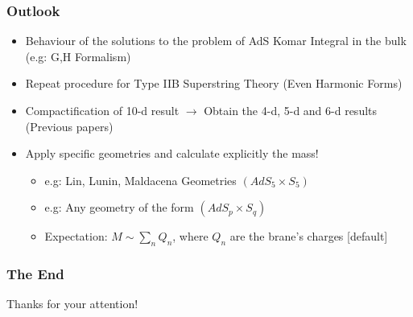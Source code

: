 \documentclass[t]{beamer}
\begin{document}

\begin{frame}
\frametitle{Outlook}

\begin{itemize}
\setlength{\parskip}{10pt}

\item<1->  Behaviour of the solutions to the problem of AdS Komar Integral in the bulk (e.g: G,H Formalism)

\item<2->  Repeat procedure for Type IIB Superstring Theory (Even Harmonic Forms)

\item<3->  Compactification of 10-d result $\rightarrow$ Obtain the 4-d, 5-d and 6-d results (Previous papers)

\item<4-> Apply specific geometries and calculate explicitly the mass!

\begin{itemize}
[triangle]
\setlength{\parskip}{5pt}
\item e.g: Lin, Lunin, Maldacena Geometries $(AdS_5 \times S_5)$
\item e.g: Any geometry of the form $(AdS_p \times S_q)$
\item Expectation: $M \sim \sum_{n} Q_{n}$, where $Q_{n}$ are the brane's charges
[default]
\end{itemize}
\end{itemize}
\end{frame}


\begin{frame}[c]
\frametitle{The End}

\begin{center}
\Huge Thanks for your attention!
\end{center}

\end{frame}
\end{document}

